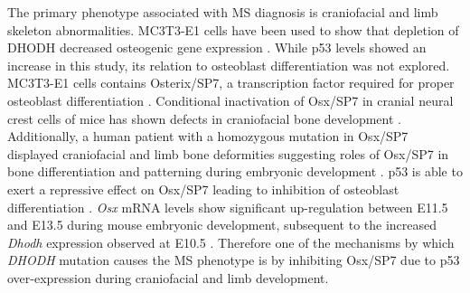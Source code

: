 \documentclass[12pt]{article}
\begin{document}

The primary phenotype associated with MS diagnosis is craniofacial and limb skeleton abnormalities. MC3T3-E1 cells have been used to show that depletion of DHODH decreased osteogenic gene expression \citep{fang2016dihydroorotate}. While p53 levels showed an increase in this study, its relation to osteoblast differentiation was not explored. MC3T3-E1 cells contains Osterix/SP7, a transcription factor required for proper osteoblast differentiation \citep{tian2012osterix}. Conditional inactivation of Osx/SP7 in cranial neural crest cells of mice has shown defects in craniofacial bone development \citep{baek2013osterix}. Additionally, a human patient with a homozygous mutation in Osx/SP7 displayed craniofacial and limb bone deformities suggesting roles of Osx/SP7 in bone differentiation and patterning during embryonic development \citep{lapunzina2010identification}.  p53 is able to exert a repressive effect on  Osx/SP7 leading to inhibition of osteoblast differentiation \citep{p53sp7}.  \textit{Osx} mRNA levels show significant up-regulation between E11.5 and E13.5 during mouse embryonic development, subsequent to the increased \textit{Dhodh} expression observed at E10.5 \citep{ gao2004molecular,  kaback2008osterix, doi:10.1093/hmg/dds218}. Therefore one of the mechanisms by which \textit{DHODH} mutation causes the MS phenotype is by inhibiting  Osx/SP7  due to p53 over-expression during craniofacial and limb development. 
\end{document}
